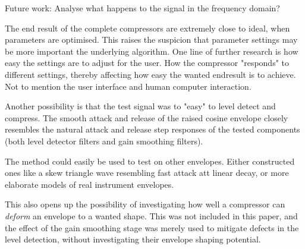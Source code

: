 \documentclass[../main2.tex]{subfiles}
\begin{document}
Future work: Analyse what happens to the signal in the frequency domain?

The end result of the complete compressors are extremely close to ideal, when parameters are optimised. This raises the suspicion that parameter settings may be more important the underlying algorithm. One line of further research is how easy the settings are to adjust for the user. How the compressor "responds" to different settings, thereby affecting how easy the wanted endresult is to achieve. Not to mention the user interface and human computer interaction.

Another possibility is that the test signal was to "easy" to level detect and compress. The smooth attack and release of the raised cosine envelope closely resembles the natural attack and release step responses of the tested components (both level detector filters and gain smoothing filters).

The method could easily be used to test on other envelopes. Either constructed ones like a skew triangle wave resembling fast attack att linear decay, or more elaborate models of real instrument envelopes.

This also opens up the possibility of investigating how well a compressor can \emph{deform} an envelope to a wanted shape. This was not included in this paper, and the effect of the gain smoothing stage was merely used to mitigate defects in the level detection, without investigating their envelope shaping potential. 
\end{document}
